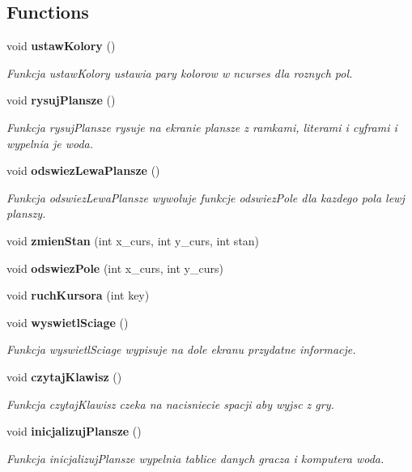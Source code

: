 \subsection*{Functions}
\begin{DoxyCompactItemize}
\item 
void \textbf{ ustaw\+Kolory} ()
\begin{DoxyCompactList}\small\item\em Funkcja ustaw\+Kolory ustawia pary kolorow w ncurses dla roznych pol. \end{DoxyCompactList}\item 
void \textbf{ rysuj\+Plansze} ()
\begin{DoxyCompactList}\small\item\em Funkcja rysuj\+Plansze rysuje na ekranie plansze z ramkami, literami i cyframi i wypelnia je woda. \end{DoxyCompactList}\item 
void \textbf{ odswiez\+Lewa\+Plansze} ()
\begin{DoxyCompactList}\small\item\em Funkcja odswiez\+Lewa\+Plansze wywoluje funkcje odswiez\+Pole dla kazdego pola lewj planszy. \end{DoxyCompactList}\item 
void \textbf{ zmien\+Stan} (int x\+\_\+curs, int y\+\_\+curs, int stan)
\item 
void \textbf{ odswiez\+Pole} (int x\+\_\+curs, int y\+\_\+curs)
\item 
void \textbf{ ruch\+Kursora} (int key)
\item 
void \textbf{ wyswietl\+Sciage} ()
\begin{DoxyCompactList}\small\item\em Funkcja wyswietl\+Sciage wypisuje na dole ekranu przydatne informacje. \end{DoxyCompactList}\item 
void \textbf{ czytaj\+Klawisz} ()
\begin{DoxyCompactList}\small\item\em Funkcja czytaj\+Klawisz czeka na nacisniecie spacji aby wyjsc z gry. \end{DoxyCompactList}\item 
void \textbf{ inicjalizuj\+Plansze} ()
\begin{DoxyCompactList}\small\item\em Funkcja inicjalizuj\+Plansze wypelnia tablice danych gracza i komputera woda. \end{DoxyCompactList}\item 

\end{DoxyCompactItemize}
